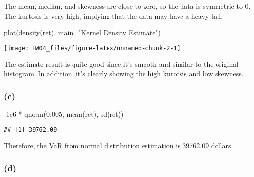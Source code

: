 \documentclass[
]{article}
\newenvironment{Shaded}{\begin{snugshade}}{\end{snugshade}}
\newcommand{\AttributeTok}[1]{\textcolor[rgb]{0.77,0.63,0.00}{#1}}
\newcommand{\FloatTok}[1]{\textcolor[rgb]{0.00,0.00,0.81}{#1}}
\newcommand{\FunctionTok}[1]{\textcolor[rgb]{0.00,0.00,0.00}{#1}}
\newcommand{\NormalTok}[1]{#1}
\newcommand{\SpecialCharTok}[1]{\textcolor[rgb]{0.00,0.00,0.00}{#1}}
\newcommand{\StringTok}[1]{\textcolor[rgb]{0.31,0.60,0.02}{#1}}
\begin{document}
The mean, median, and skewness are close to zero, so the data is
symmetric to 0. The kurtosis is very high, implying that the data may
have a heavy tail.

\begin{Shaded}
\begin{Highlighting}[]
\FunctionTok{plot}\NormalTok{(}\FunctionTok{density}\NormalTok{(ret), }\AttributeTok{main=}\StringTok{"Kernel Density Estimate"}\NormalTok{)}
\end{Highlighting}
\end{Shaded}

\begin{center}\texttt{[image: HW04\_files/figure-latex/unnamed-chunk-2-1]} \end{center}

The estimate result is quite good since it's smooth and similar to the
original histogram. In addition, it's clearly showing the high kurotsis
and low skewness.

\hypertarget{c}{%
\subsubsection{(c)}\label{c}}

\begin{Shaded}
\begin{Highlighting}[]
\SpecialCharTok{{-}}\FloatTok{1e6} \SpecialCharTok{*} \FunctionTok{qnorm}\NormalTok{(}\FloatTok{0.005}\NormalTok{, }\FunctionTok{mean}\NormalTok{(ret), }\FunctionTok{sd}\NormalTok{(ret))}
\end{Highlighting}
\end{Shaded}

\begin{verbatim}
## [1] 39762.09
\end{verbatim}

Therefore, the VaR from normal distribution estimation is 39762.09
dollars

\hypertarget{d}{%
\subsubsection{(d)}\label{d}}
\end{document}
